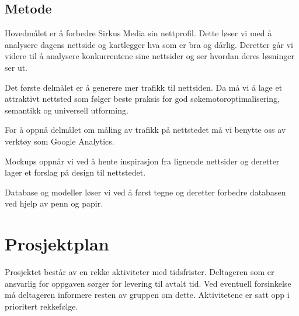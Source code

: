 \documentclass[11pt,a4paper]{report}
\begin{document}
\subsection*{Metode}
Hovedmålet er å forbedre Sirkus Media sin nettprofil. Dette løser vi med å analysere dagens nettside og kartlegger hva som er bra og dårlig. Deretter går vi videre til å analysere konkurrentene sine nettsider og ser hvordan deres løsninger ser ut. 

Det første delmålet er å generere mer trafikk til nettsiden. Da må vi å lage et attraktivt nettsted som følger beste praksis for god søkemotoroptimalisering, semantikk og universell utforming. 

For å oppnå delmålet om måling av trafikk på nettstedet må vi benytte oss av verktøy som Google Analytics. 

Mockups oppnår vi ved å hente inspirasjon fra lignende nettsider og deretter lager et forslag på design til nettstedet.

Database og modeller løser vi ved å først tegne og deretter forbedre databasen ved hjelp av penn og papir. 

\section*{Prosjektplan}

Prosjektet består av en rekke aktiviteter med tidsfrister. Deltageren som er ansvarlig for oppgaven sørger for levering til avtalt tid. Ved eventuell forsinkelse må deltageren informere resten av gruppen om dette. Aktivitetene er satt opp i prioritert rekkefølge.

\smallskip

\setcounter{aktivitetTeller}{1}
\end{document}
